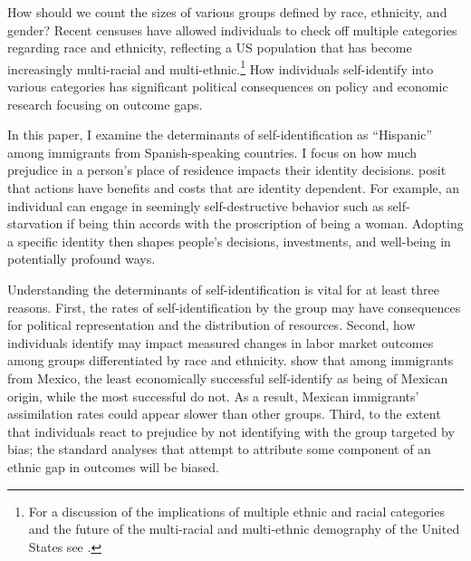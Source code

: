 \documentclass[12pt, fullpage]{article}
\begin{document}
How should we count the sizes of various groups defined by race, ethnicity, and gender? Recent censuses have allowed individuals to check off multiple categories regarding race and ethnicity, reflecting a US population that has become increasingly multi-racial and multi-ethnic.\footnote{For a discussion of the implications of multiple ethnic and racial categories and the future of the multi-racial and multi-ethnic demography of the United States see \citet{bratterMultiracialIdentificationRacial2018,albaGreatDemographicIllusion2020}.} How individuals self-identify into various categories has significant political consequences on policy and economic research focusing on outcome gaps.

In this paper, I examine the determinants of self-identification as ``Hispanic'' among immigrants from Spanish-speaking countries. I focus on how much prejudice in a person's place of residence impacts their identity decisions.  \citet{akerlofEconomicsIdentity2000} posit that actions have benefits and costs that are identity dependent. For example, an individual can engage in seemingly self-destructive behavior such as self-starvation if being thin accords with the proscription of being a woman. Adopting a specific identity then shapes people's decisions, investments, and well-being in potentially profound ways. 

Understanding the determinants of self-identification is vital for at least three reasons. First, the rates of self-identification by the group may have consequences for political representation and the distribution of resources. Second, how individuals identify may impact measured changes in labor market outcomes among groups differentiated by race and ethnicity.  \citet{antmanEthnicAttritionObserved2016} show that among immigrants from Mexico, the least economically successful self-identify as being of Mexican origin, while the most successful do not. As a result, Mexican immigrants' assimilation rates could appear slower than other groups. Third, to the extent that individuals react to prejudice by not identifying with the group targeted by bias; the standard analyses that attempt to attribute some component of an ethnic gap in outcomes will be biased.
\end{document}
